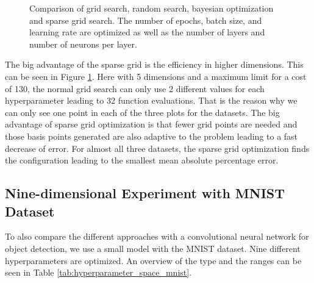 \begin{figure}[H]
	\caption{  Comparison of grid search, random search, bayesian optimization and sparse grid search. The number of epochs, batch size, and learning rate are optimized as well as the number of layers and number of neurons per layer. }	
	\label{fig:result_second_comparison_dim5}
\end{figure}


The big advantage of the sparse grid is the efficiency in higher dimensions. This can be seen in Figure \ref{fig:result_second_comparison_dim5}. Here with 5 dimensions and a maximum limit for a cost of 130, the normal grid search can only use 2 different values for each hyperparameter leading to 32 function evaluations. That is the reason why we can only see one point in each of the three plots for the datasets. The big advantage of sparse grid optimization is that fewer grid points are needed and those basis points generated are also adaptive to the problem leading to a fast decrease of error. For almost all three datasets, the sparse grid optimization finds the configuration leading to the smallest mean absolute percentage error. 


\subsection{Nine-dimensional Experiment with MNIST Dataset}

To also compare the different approaches with a convolutional neural network for object detection, we use a small model with the MNIST dataset. Nine different hyperparameters are optimized. An overview of the type and the ranges can be seen in Table \ref{tab:hyperparameter_space_mnist}.

